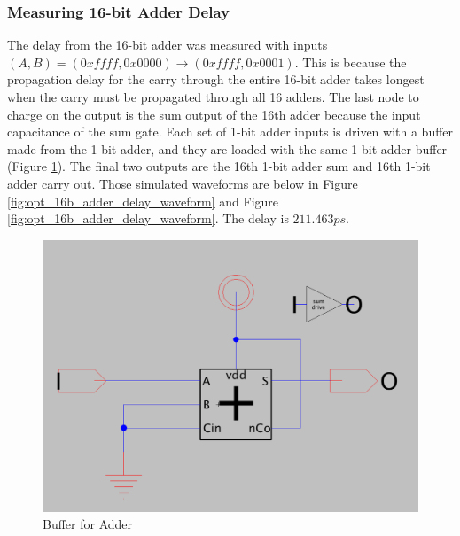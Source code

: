 \documentclass{article}
\begin{document}
\subsubsection{Measuring 16-bit Adder Delay}
The delay from the 16-bit adder was measured with inputs $(A, B) = (0xffff, 0x0000) \rightarrow (0xffff, 0x0001)$. This is because the propagation delay for the carry through the entire 16-bit adder takes longest when the carry must be propagated through all 16 adders. The last node to charge on the output is the sum output of the 16th adder because the input capacitance of the sum gate. Each set of 1-bit adder inputs is driven with a buffer made from the 1-bit adder, and they are loaded with the same 1-bit adder buffer (Figure \ref{fig:opt_adder_buffer_sch}). The final two outputs are the 16th 1-bit adder sum and 16th 1-bit adder carry out. Those simulated waveforms are below in Figure \ref{fig:opt_16b_adder_delay_waveform} and Figure \ref{fig:opt_16b_adder_delay_waveform}. The delay is $211.463ps$.

\begin{figure}[H]
  \includegraphics[width=\linewidth]{opt_screenshots/opt_adder_buffer_sch.png}
  \caption{Buffer for Adder}
  \label{fig:opt_adder_buffer_sch}
\end{figure}
\end{document}
